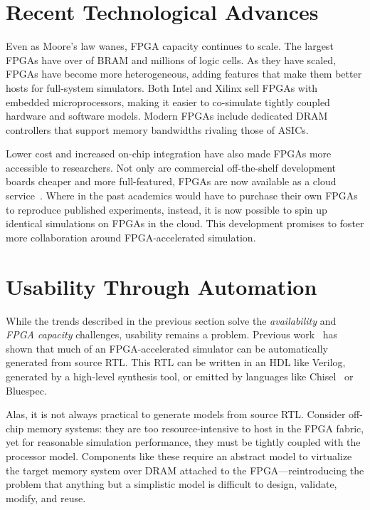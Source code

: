 \section{Recent Technological Advances}

Even as Moore's law wanes, FPGA capacity continues to scale. The largest FPGAs
have over  of BRAM and millions of logic cells.
As they
have scaled, FPGAs have become more heterogeneous, adding features that make
them better hosts for full-system simulators.  Both Intel and Xilinx sell FPGAs
with embedded microprocessors, making it easier to co-simulate tightly coupled
hardware and software models. Modern FPGAs include dedicated DRAM
controllers that support memory bandwidths rivaling those of ASICs.

Lower cost and increased on-chip integration have also made FPGAs more
accessible to researchers.  Not only are commercial off-the-shelf development
boards cheaper and more full-featured, FPGAs are now available as a cloud service~\cite{amazonf1}.
Where in the past academics would have to purchase their own FPGAs to reproduce
published experiments, instead, it is now possible to spin up identical
simulations on FPGAs in the cloud.  This development promises to foster more
collaboration around FPGA-accelerated simulation.

\section{Usability Through Automation}

While the trends described in the previous section solve the
\emph{availability} and \emph{FPGA capacity} challenges, usability remains a
problem. Previous work~\cite{fabscalarfpga, strober} has shown that much of an
FPGA-accelerated simulator can be automatically generated from source RTL. This RTL
can be written in an HDL like Verilog, generated by a high-level synthesis
tool, or emitted by languages like Chisel~\cite{Chisel} or Bluespec.

Alas, it is not always practical to generate models from source
RTL. Consider off-chip memory systems: they are too resource-intensive to host
in the FPGA fabric, yet for reasonable simulation performance, they must be
tightly coupled with the processor model.  Components like these require
an abstract model to virtualize the target memory system over DRAM attached
to the FPGA---reintroducing the problem that anything
but a simplistic model is difficult to design, validate, modify, and reuse.

